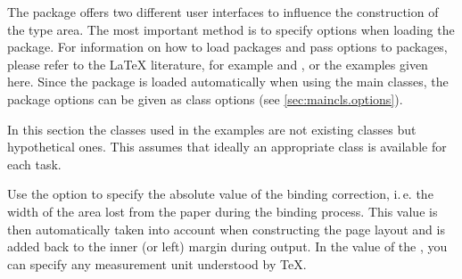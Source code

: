 The  package offers two different user interfaces to
influence the construction of the type area. The most important method is to
specify options when loading the package. For information on how to load
packages and pass options to packages, please refer to the {\LaTeX}
literature, for example \cite{lshort} and \cite{latex:usrguide}, or the
examples given here. Since the  package is loaded
automatically when using the main {\KOMAScript} classes, the package options
can be given as class options (see \autoref{sec:maincls.options}).

In this section the classes used in the examples are not
existing {\KOMAScript} classes but hypothetical ones. This
 assumes that ideally an appropriate class is available
for each task.

\begin{Declaration}
\end{Declaration}%
Use the 
option to specify the absolute value of the binding correction, i.\,e. the width of the area lost
from the paper during the binding process. This value is then automatically
taken into account when constructing the page layout and is added back to the
inner (or left) margin during output. In the value of the ,
you can specify any measurement unit understood by \TeX{}.

